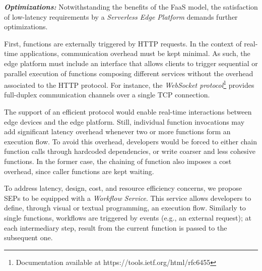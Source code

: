 \textbf{\textit{Optimizations:}} Notwithstanding the benefits of the FaaS model,
the satisfaction of low-latency requirements by a \textit{Serverless Edge Platform} demands further optimizations.

First, functions are externally triggered by HTTP requests. In the context of real-time applications, communication overhead must be kept minimal. As such, the edge platform must include an interface that allows clients to trigger sequential or parallel execution of functions composing different services without the overhead associated to the HTTP protocol. For instance, the \textit{WebSocket protocol}\footnote{Documentation available at https://tools.ietf.org/html/rfc6455}
provides full-duplex communication channels over a single TCP connection. %


The support of an efficient protocol would enable real-time interactions between edge devices and the edge platform. Still, individual function invocations may add significant latency overhead whenever two or more functions form an execution flow. To avoid this overhead, developers would be forced to either chain function calls through hardcoded dependencies, or write coarser and less cohesive functions. In the former case, the chaining of function also imposes a cost overhead, since caller functions are kept waiting.%

To address latency, design, cost, and resource efficiency concerns, we propose SEPs to be equipped with a \textit{Workflow Service}. This service allows developers to define, through visual or textual programming, an execution flow.
Similarly to single functions, workflows are triggered by events (e.g., an external request); at each intermediary step, result from the current function is passed to the subsequent one. 

